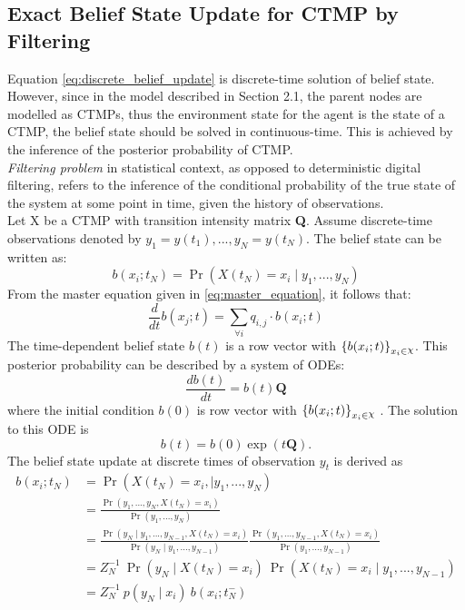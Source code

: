 \subsection{Exact Belief State Update for CTMP by Filtering}
\label{sec:filtering_CTMC}
Equation \ref{eq:discrete_belief_update} is discrete-time solution of belief state. However, since in the model described in Section 2.1, the parent nodes are modelled as CTMPs, thus the environment state for the agent is the state of a CTMP, the belief state should be solved in continuous-time. This is achieved by the inference of the posterior probability of CTMP. \cite{article}\\
\textit{Filtering problem} in statistical context, as opposed to deterministic digital filtering, refers to the inference of the conditional probability of the true state of the system at some point in time, given the history of observations. \cite{Godsill2019}\\
Let X be a CTMP with transition intensity matrix \textbf{Q}. Assume discrete-time observations denoted by $ y_{1}=y(t_{1}), ..., y_{N}=y(t_{N}) $. The belief state can be written as:
\begin{equation}
b(x_{i};t_{N}) = \operatorname{Pr}(X(t_{N}) = x_{i} \mid y_{1}, ..., y_{N})
\end{equation}
From the master equation given in \autoref{eq:master_equation}, it follows that:
\begin{equation}
\frac{d}{dt} b(x_{j};t)  = \sum_{\forall i} q_{i,j} \cdot b(x_{i};t)
\end{equation}
The time-dependent belief state $ b(t) $ is a row vector with $ \left\lbrace b(x_{i};t)\right\rbrace_{x_{i} \in \rchi}  $.
This posterior probability can be described by a system of ODEs:
\begin{equation}
\frac{db(t)}{dt} = b(t)\textbf{Q}
\end{equation}
where the initial condition $ b(0) $ is row vector with $ \left\lbrace b(x_{i};t)\right\rbrace_{x_{i} \in \rchi} $ \cite{article}. The solution to this ODE is
\begin{equation}
b(t) = b(0) \exp(t\textbf{Q}).
\label{eq:b_cont}
\end{equation}
The belief state update at discrete times of observation $ y_{t} $ is derived as 
\begin{align}
b(x_{i}; t_{N}) & = \operatorname{Pr}( X(t_{N}) = x_{i},\mid y_{1}, ..., y_{N}) \nonumber\\ & = \frac{\operatorname{Pr}(y_{1}, ..., y_{N}, X(t_{N}) = x_{i})}{\operatorname{Pr}(y_{1}, ..., y_{N})}  \nonumber\\ & = \frac{\operatorname{Pr}(y_{N} \mid y_{1}, ..., y_{N-1}, X(t_{N}) = x_{i})}{\operatorname{Pr}(y_{N} \mid y_{1}, ..., y_{N-1})} \frac{\operatorname{Pr}(y_{1}, ..., y_{N-1}, X(t_{N}) = x_{i})}{\operatorname{Pr}(y_{1}, ..., y_{N-1})}  \nonumber\\ & = Z_{N}^{-1} \ \operatorname{Pr}(y_{N} \mid X(t_{N})=x_{i})\ \operatorname{Pr}( X(t_{N}) = x_{i}\mid y_{1}, ..., y_{N-1})  \nonumber\\ & = Z_{N}^{-1}\ {p(y_{N} \mid x_{i})}\ {b(x_{i}; t_{N}^{-})}
\label{eq:b_jump}
\end{align}
